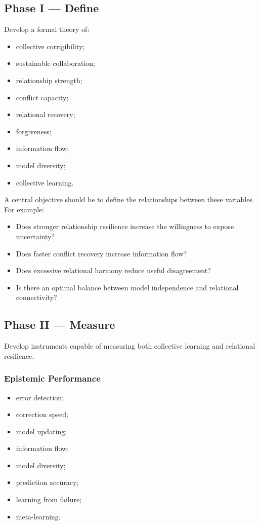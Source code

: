 \documentclass{article}
\begin{document}
\subsection{Phase I — Define}
Develop a formal theory of:
\begin{itemize}
    \item collective corrigibility;
    \item sustainable collaboration;
    \item relationship strength;
    \item conflict capacity;
    \item relational recovery;
    \item forgiveness;
    \item information flow;
    \item model diversity;
    \item collective learning.
\end{itemize}

A central objective should be to define the relationships between these variables. For example:
\begin{itemize}
    \item Does stronger relationship resilience increase the willingness to expose uncertainty?
    \item Does faster conflict recovery increase information flow?
    \item Does excessive relational harmony reduce useful disagreement?
    \item Is there an optimal balance between model independence and relational connectivity?
\end{itemize}

\subsection{Phase II — Measure}
Develop instruments capable of measuring both collective learning and relational resilience.

\subsubsection{Epistemic Performance}
\begin{itemize}
    \item error detection;
    \item correction speed;
    \item model updating;
    \item information flow;
    \item model diversity;
    \item prediction accuracy;
    \item learning from failure;
    \item meta-learning.
\end{itemize}
\end{document}

